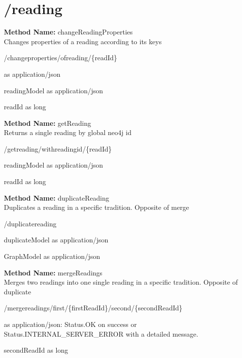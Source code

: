 \section{/reading}
\textbf{Method Name: }changeReadingProperties \\ Changes properties of a reading according to its keys
\begin{post}
/changeproperties/ofreading/\{readId\}
\end{post}
\begin{request}
 as application/json
\end{request}
\begin{response}
readingModel as application/json
\end{response}
\begin{parameter}
readId as long
\end{parameter}
\textbf{Method Name: }getReading \\ Returns a single reading by global neo4j id
\begin{get}
/getreading/withreadingid/\{readId\}
\end{get}
\begin{response}
readingModel as application/json
\end{response}
\begin{parameter}
readId as long
\end{parameter}
\textbf{Method Name: }duplicateReading \\ Duplicates a reading in a specific tradition. Opposite of merge
\begin{post}
/duplicatereading
\end{post}
\begin{request}
duplicateModel as application/json
\end{request}
\begin{response}
GraphModel as application/json
\end{response}
\textbf{Method Name: }mergeReadings \\ Merges two readings into one single reading in a specific tradition. Opposite of duplicate
\begin{post}
/mergereadings/first/\{firstReadId\}/second/\{secondReadId\}
\end{post}
\begin{response}
 as application/json: Status.OK on success or Status.INTERNAL\_SERVER\_ERROR with a detailed message.
\end{response}
\begin{parameter}
secondReadId as long
\end{parameter}
